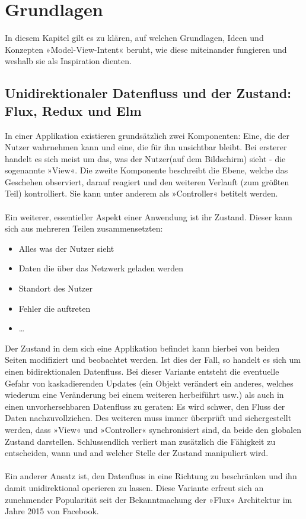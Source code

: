 \section{Grundlagen}
\label{sec:grundlagen}

In diesem Kapitel gilt es zu klären, auf welchen Grundlagen, Ideen und Konzepten »Model-View-Intent« beruht, wie diese miteinander fungieren und weshalb sie als Inspiration dienten.

\subsection{Unidirektionaler Datenfluss und der Zustand: Flux, Redux und Elm}

In einer Applikation existieren grundsätzlich zwei Komponenten: Eine, die der Nutzer wahrnehmen kann und eine, die für ihn unsichtbar bleibt. Bei ersterer handelt es sich meist um das, was der Nutzer(auf dem Bildschirm) sieht - die sogenannte »View«. Die zweite Komponente beschreibt die Ebene, welche das Geschehen observiert, darauf reagiert und den weiteren Verlauft (zum größten Teil) kontrolliert. Sie kann unter anderem als »Controller« betitelt werden.
\\
\\
Ein weiterer, essentieller Aspekt einer Anwendung ist ihr Zustand. Dieser kann sich aus mehreren Teilen zusammensetzten:
\begin{itemize}
	\item Alles was der Nutzer sieht
	\item Daten die über das Netzwerk geladen werden
	\item Standort des Nutzer
	\item Fehler die auftreten
	\item \dots
\end{itemize}
Der Zustand in dem sich eine Applikation befindet kann hierbei von beiden Seiten modifiziert und beobachtet werden. Ist dies der Fall, so handelt es sich um einen bidirektionalen Datenfluss. Bei dieser Variante entsteht die eventuelle Gefahr von kaskadierenden Updates (ein Objekt verändert ein anderes, welches wiederum eine Veränderung bei einem weiteren herbeiführt usw.) als auch in einen unvorhersehbaren Datenfluss zu geraten: Es wird schwer, den Fluss der Daten nachzuvollziehen. Des weiteren muss immer überprüft und sichergestellt werden, dass »View« und »Controller« synchronisiert sind, da beide den globalen Zustand darstellen. Schlussendlich verliert man zusätzlich die Fähigkeit zu entscheiden, wann und and welcher Stelle der Zustand manipuliert wird.
\\
\\
Ein anderer Ansatz ist, den Datenfluss in eine Richtung zu beschränken und ihn damit unidirektional
\cite{unidirectionalDataFlowFluxArchitectureIlyGelman2017, unidirectionalDataFlowTheCompleteReduxBookIlyGelman2017}
operieren zu lassen. Diese Variante erfreut sich an zunehmender Popularität seit der Bekanntmachung der »Flux«
\cite{fluxArchitectureAdamBoduch}
Architektur im Jahre 2015 von Facebook.
\cite{fluxAnnouncementYoutube}

